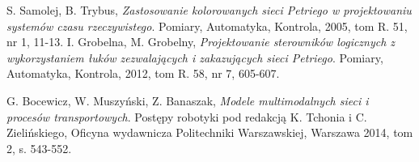 \documentclass[10pt, a4paper]{article}
\begin{document}
\begin{thebibliography}{9}
  S. Samolej, B. Trybus,
  \emph{Zastosowanie kolorowanych sieci Petriego w projektowaniu systemów czasu rzeczywistego}.
  Pomiary, Automatyka, Kontrola,
  2005,
  tom R. 51, nr 1,
  11-13.
  I. Grobelna, M. Grobelny,
  \emph{Projektowanie sterowników logicznych z wykorzystaniem łuków zezwalających i zakazujących sieci Petriego}.	
  Pomiary, Automatyka, Kontrola,
  2012,
  tom R. 58, nr 7,
  605-607.
  
  G. Bocewicz, W. Muszyński, Z. Banaszak,
  \emph{Modele multimodalnych sieci i procesów transportowych}.
  Postępy robotyki pod redakcją K. Tchonia i C. Zielińskiego,
  Oficyna wydawnicza Politechniki Warszawskiej,
   Warszawa 2014,
   tom 2, s. 543-552.

\end{thebibliography}
\end{document}
